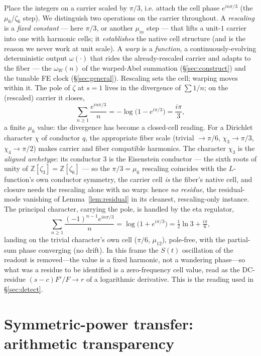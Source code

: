 \documentclass[11pt]{article}
\theoremstyle{definition}
\begin{document}
Place the integers on a carrier scaled by $\pi/3$, i.e. attach the cell phase $e^{in\pi/3}$ (the
$\mu_6$/$\zeta_6$ step). We distinguish two operations on the carrier throughout. A \emph{rescaling} is a
\emph{fixed constant} --- here $\pi/3$, or another $\mu_m$ step --- that lifts a unit-$1$ carrier into one
with harmonic cells; it \emph{establishes} the native cell structure (and is the reason we never work at
unit scale). A \emph{warp} is a \emph{function}, a continuously-evolving deterministic output
$\omega(\cdot)$ that rides the already-rescaled carrier and adapts to the fiber --- the $\omega_W(n)$ of the
warped-Abel summation (\S\ref{sec:construct}) and the tunable FE clock (\S\ref{sec:general}). Rescaling sets
the cell; warping moves within it. The pole of $\zeta$ at $s=1$ lives in the divergence of $\sum 1/n$; on
the (rescaled) carrier it closes,
\[
  \sum_{n\ge1}\frac{e^{in\pi/3}}{n}=-\log\!\big(1-e^{i\pi/3}\big)=\frac{i\pi}{3},
\]
a finite $\mu_6$ value: the divergence has become a closed-cell reading. For a Dirichlet character
$\chi$ of conductor $q$, the appropriate fiber scale (trivial $\to\pi/6$, $\chi_3\to\pi/3$,
$\chi_4\to\pi/2$) makes carrier and fiber compatible harmonics. The character $\chi_3$ is the
\emph{aligned archetype}: its conductor $3$ is the Eisenstein conductor --- the sixth roots of unity of
$\mathbb Z[\zeta_3]=\mathbb Z[\zeta_6]$ --- so the $\pi/3=\mu_6$ rescaling coincides with the $L$-function's
own conductor symmetry, the carrier cell \emph{is} the fiber's native cell, and closure needs the rescaling
alone with no warp: hence \emph{no residue}, the residual-mode vanishing of Lemma~\ref{lem:residual} in its
cleanest, rescaling-only instance. The principal character, carrying the
pole, is handled by the eta regulator,
\[
  \sum_{n\ge1}\frac{(-1)^{n-1}e^{in\pi/3}}{n}=\log\!\big(1+e^{i\pi/3}\big)=\tfrac12\ln3+\tfrac{i\pi}{6},
\]
landing on the trivial character's own cell ($\pi/6$, $\mu_{12}$), pole-free, with the partial-sum
phase converging (no drift). In this frame the $S(t)$ oscillation of the readout is removed---the
value is a fixed harmonic, not a wandering phase---so what was a residue to be identified is a
zero-frequency cell value, read as the DC-residue $(s-c)F'/F\to r$ of a logarithmic derivative. This
is the reading used in \S\ref{sec:detect}.

\section{Symmetric-power transfer: arithmetic transparency}\label{sec:fl}
\end{document}
